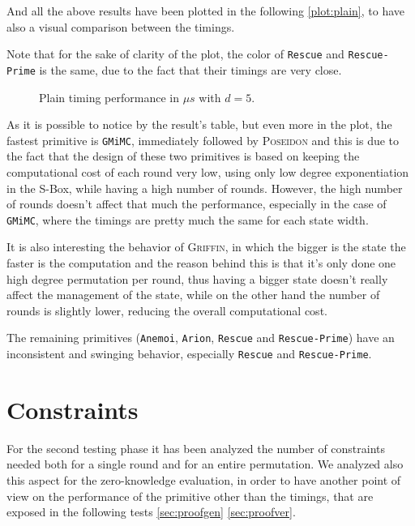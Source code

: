 \documentclass[12pt, a4paper]{report}
\begin{document}
And all the above results have been plotted in the following \autoref{plot:plain}, to have also a visual comparison between the timings.

Note that for the sake of clarity of the plot, the color of \texttt{Rescue} and \texttt{Rescue-Prime} is the same, due to the fact that their timings are very close.

\begin{figure}[H]
  \hspace{60pt}
  \caption{Plain timing performance in $\mu s$ with $d = 5$.}\label{plot:plain}
\end{figure}

As it is possible to notice by the result's table, but even more in the plot, the fastest primitive is \texttt{GMiMC}, immediately followed by \textsc{Poseidon} and this is due to the fact that the design of these two primitives is based on keeping the computational cost of each round very low, using only low degree exponentiation in the S-Box, while having a high number of rounds.
However, the high number of rounds doesn't affect that much the performance, especially in the case of \texttt{GMiMC}, where the timings are pretty much the same for each state width.

It is also interesting the behavior of \textsc{Griffin}, in which the bigger is the state the faster is the computation and the reason behind this is that it's only done one high degree permutation per round, thus having a bigger state doesn't really affect the management of the state, while on the other hand the number of rounds is slightly lower, reducing the overall computational cost.

The remaining primitives (\texttt{Anemoi}, \texttt{Arion}, \texttt{Rescue} and \texttt{Rescue-Prime}) have an inconsistent and swinging behavior, especially \texttt{Rescue} and \texttt{Rescue-Prime}.

\section{Constraints}\label{sec:constraints}

For the second testing phase it has been analyzed the number of constraints needed both for a single round and for an entire permutation.
We analyzed also this aspect for the zero-knowledge evaluation, in order to have another point of view on the performance of the primitive other than the timings, that are exposed in the following tests \autoref{sec:proofgen} \autoref{sec:proofver}.
\end{document}
